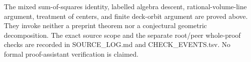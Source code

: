 The mixed sum-of-squares identity, labelled algebra descent,
rational-volume-line argument, treatment of centers, and finite
deck-orbit argument are proved above. They invoke neither a preprint
theorem nor a conjectural geometric decomposition. The exact source
scope and the separate root/peer whole-proof checks are recorded in
SOURCE\_LOG.md and CHECK\_EVENTS.tsv. No formal proof-assistant
verification is claimed.
